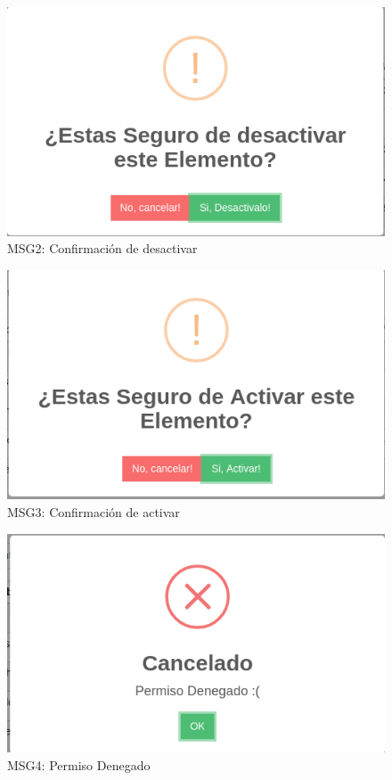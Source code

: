 \begin{figure}[htbp!]
	\begin{center}
		\includegraphics[scale=.5]{Pantallas/ConfirmacionDesactivar}
		\caption{MSG2: Confirmación de desactivar}
	\end{center}
\end{figure}

\begin{figure}[htbp!]
	\begin{center}
		\includegraphics[scale=.5]{Pantallas/ConfirmacionActivar}
		\caption{MSG3: Confirmación de activar}
	\end{center}
\end{figure}

\begin{figure}[htbp!]
	\begin{center}
		\includegraphics[scale=.5]{Pantallas/PermisoDenegado}
		\caption{MSG4: Permiso Denegado}
	\end{center}
\end{figure}


